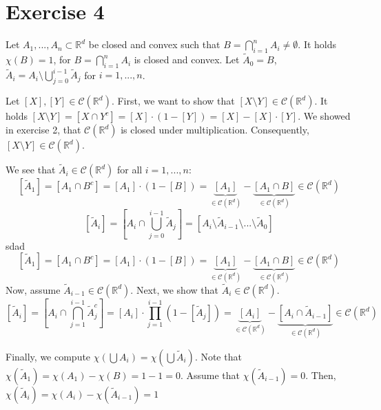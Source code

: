 \documentclass{article}
\begin{document}
\section*{Exercise 4}

Let $A_1,...,A_n \subset \mathbb R^d$ be closed and convex such that $B = \bigcap^n_{i=1} A_i \neq \emptyset$. It holds $\chi(B) = 1$, for $B = \bigcap^n_{i=1} A_i$ is closed and convex. Let $\tilde A_0 = B$, $\tilde A_i = A_i \setminus \bigcup^{i-1}_{j=0}\tilde A_{j}$ for $i=1,...,n$. 

Let $[X],[Y] \in \mathcal C(\mathbb R^d)$. First, we want to show that $[X \setminus Y] \in \mathcal C(\mathbb R^d)$. It holds $[X \setminus Y] = [X \cap Y^c] = [X] \cdot (1-[Y]) = [X] - [X] \cdot [Y]$. We showed in exercise 2, that $\mathcal C(\mathbb R^d)$ is closed under multiplication. Consequently, $[X \setminus Y] \in \mathcal C(\mathbb R^d)$.

We see that $\tilde A_i \in \mathcal C(\mathbb R^d)$ for all $i=1,...,n$:
$$
[\tilde A_1] = [A_1 \cap B^c] = [A_1] \cdot (1-[B]) = \underbrace{[A_1]}_{\in \mathcal C(\mathbb R^d)} - \underbrace{[A_1 \cap B]}_{\in \mathcal C(\mathbb R^d)} \in \mathcal C(\mathbb R^d)
$$
$$
    [\tilde A_i] = [A_i \cap \bigcup^{i-1}_{j=0}\tilde A_j] = [A_i \setminus \tilde A_{i-1} \setminus ... \setminus \tilde A_0]
$$
sdad
$$
    [\tilde A_1] = [A_1 \cap B^c] = [A_1] \cdot (1-[B]) = \underbrace{[A_1]}_{\in \mathcal C(\mathbb R^d)} - \underbrace{[A_1 \cap B]}_{\in \mathcal C(\mathbb R^d)} \in \mathcal C(\mathbb R^d)
$$
Now, assume $\tilde A_{i-1} \in \mathcal C(\mathbb R^d)$. Next, we show that $\tilde A_{i} \in \mathcal C(\mathbb R^d)$.
$$
    [\tilde A_i] = [A_i \cap \bigcap^{i-1}_{j=1}\tilde A_{j}^c] = [A_i] \cdot \prod^{i-1}_{j=1}(1-[\tilde A_{j}]) = \underbrace{[A_i]}_{\in \mathcal C(\mathbb R^d)} - \underbrace{[A_i \cap \tilde A_{i-1}]}_{\in \mathcal C(\mathbb R^d)} \in \mathcal C(\mathbb R^d)
$$

Finally, we compute $\chi(\bigcup A_i) = \chi(\bigcup \tilde A_i)$. Note that $\chi(\tilde A_1) = \chi(A_1) - \chi(B) = 1 - 1 = 0$. Assume that $\chi(\tilde A_{i-1}) = 0$. Then, $\chi(\tilde A_i) = \chi(A_i) - \chi(\tilde A_{i-1}) = 1 $
\end{document}
